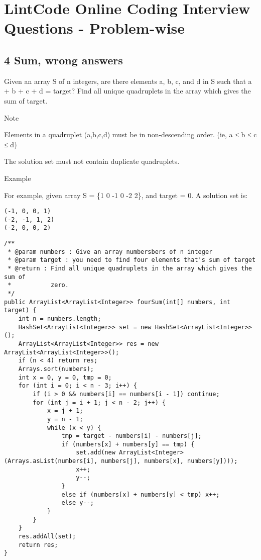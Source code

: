 \documentclass[9pt, b5paaper]{book}
\begin{document}
\chapter{LintCode Online Coding Interview Questions - Problem-wise}
\label{sec-5}
\section{4 Sum, wrong answers}
\label{sec-5-1}

Given an array S of n integers, are there elements a, b, c, and d in S such that a + b + c + d = target? Find all unique quadruplets in the array which gives the sum of target.

Note

Elements in a quadruplet (a,b,c,d) must be in non-descending order. (ie, a ≤ b ≤ c ≤ d)

The solution set must not contain duplicate quadruplets.

Example

For example, given array S = \{1 0 -1 0 -2 2\}, and target = 0. A solution set is:
\begin{verbatim}
(-1, 0, 0, 1)
(-2, -1, 1, 2)
(-2, 0, 0, 2)
\end{verbatim}
\begin{verbatim}
/**
 * @param numbers : Give an array numbersbers of n integer
 * @param target : you need to find four elements that's sum of target
 * @return : Find all unique quadruplets in the array which gives the sum of
 *           zero.
 */
public ArrayList<ArrayList<Integer>> fourSum(int[] numbers, int target) {     
    int n = numbers.length;
    HashSet<ArrayList<Integer>> set = new HashSet<ArrayList<Integer>>();
    ArrayList<ArrayList<Integer>> res = new ArrayList<ArrayList<Integer>>();
    if (n < 4) return res;
    Arrays.sort(numbers);
    int x = 0, y = 0, tmp = 0;
    for (int i = 0; i < n - 3; i++) {
        if (i > 0 && numbers[i] == numbers[i - 1]) continue;
        for (int j = i + 1; j < n - 2; j++) {
            x = j + 1;
            y = n - 1;
            while (x < y) {
                tmp = target - numbers[i] - numbers[j];
                if (numbers[x] + numbers[y] == tmp) {
                    set.add(new ArrayList<Integer>(Arrays.asList(numbers[i], numbers[j], numbers[x], numbers[y])));
                    x++;
                    y--;
                }
                else if (numbers[x] + numbers[y] < tmp) x++;
                else y--;
            }
        }
    }
    res.addAll(set);
    return res;
}
\end{verbatim}
\end{document}
